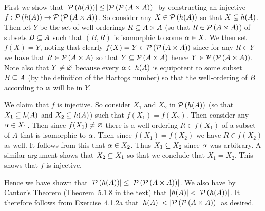 \begin{solution}
    \def\pha{\pset{h(A)}}
    \def\paa{\pset{\pset{A \times A}}}
	First we show that $\abs{\pha} \leq \abs{\paa}$ by constructing an injective $f : \pha \to \paa$.
    So consider any $X \in \pha$ so that $X \ss h(A)$.
    Then let $Y$ be the set of well-orderings $R \ss A \times A$ (so that $R \in \pset{A \times A}$) of subsets $B \ss A$ such that $(B,R)$ is isomorphic to some $\a \in X$.
    We then set $f(X) = Y$, noting that clearly $f(X) = Y \in \paa$ since for any $R \in Y$ we have that $R \in \pset{A \times A}$ so that $Y \ss \pset{A \times A}$ hence $Y \in \paa$.
    Note also that $Y \neq \es$ because every $\a \in h(A)$ is equipotent to some subset $B \ss A$ (by the definition of the Hartogs number) so that the well-ordering of $B$ according to $\a$ will be in $Y$.

    We claim that $f$ is injective.
    So consider $X_1$ and $X_2$ in $\pha$ (so that $X_1 \ss h(A)$ and $X_2 \ss h(A)$) such that $f(X_1) = f(X_2)$.
    Then consider any $\a \in X_1$.
    Then since $f(X_1) \neq \es$ there is a well-ordering $R \in f(X_1)$ of a subset of $A$ that is isomorphic to $\a$.
    Then since $f(X_1) = f(X_2)$ we have $R \in f(X_2)$ as well.
    It follows from this that $\a \in X_2$.
    Thus $X_1 \ss X_2$ since $\a$ was arbitrary.
    A similar argument shows that $X_2 \ss X_1$ so that we conclude that $X_1 = X_2$.
    This shows that $f$ is injective.

    Hence we have shown that $\abs{\pha} \leq \abs{\paa}$.
    We also have by Cantor's Theorem (Theorem~5.1.8 in the text) that $\abs{h(A)} < \abs{\pha}$.
    It therefore follows from Exercise~4.1.2a that $\abs{h(A)} < \abs{\paa}$ as desired. \qedsymbol
\end{solution}

\def\ex{7.1.6}
\setcounter{itm}{0}
\question{\ex}

